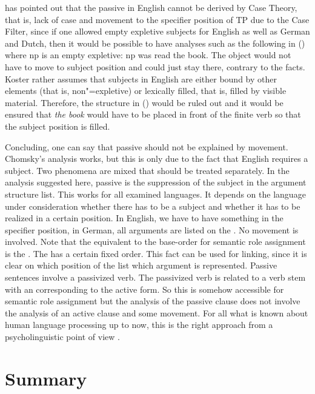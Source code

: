 \citet[]{Koster86a} has pointed out that the passive in English cannot be derived by Case
Theory, that is, lack of case and movement to the specifier position of TP due to the Case Filter, since if one allowed empty expletive subjects for English as well as German and Dutch, then it would be possible
to have analyses such as the following in () where np is an empty expletive:
\ea
np was read the book.
\z
The object would not have to move to subject position and could just stay there, contrary to the facts.
Koster rather assumes that subjects in English are either bound by other elements (that is, non"=expletive) or lexically filled, that
is, filled by visible material.
Therefore, the structure in () would be ruled out and it would be ensured that \emph{the book} would have to be placed in front
of the finite verb so that the subject position is filled.

Concluding, one can say that passive should not be explained by movement. Chomsky's analysis works,
but this is only due to the fact that English requires a subject. Two phenomena are mixed that
should be treated separately. In the analysis suggested here, passive is the suppression of the
subject in the argument structure list. This works for all examined languages. It depends on the
language under consideration whether there has to be a subject and whether it has to be realized in
a certain position. In English, we have to have something in the specifier position, in German, all
arguments are listed on the \compsl. No movement is involved. Note that the equivalent to the
base-order for semantic role assignment is the \argstl. The \argstl has a certain fixed order. This fact
can be used for linking, since it is clear on which position of the list which argument is
represented. Passive sentences involve a passivized verb. The passivized verb is related to a verb
stem with an \argstl corresponding to the active form. So this \argstl is somehow accessible for
semantic role assignment but the analysis of the passive clause does not involve the analysis of an
active clause and some movement. For all what is known about human language processing up to now, this is
the right approach from a psycholinguistic point of view \citep[Section~3.2]{Wasow2021a}. 




\section{Summary}

